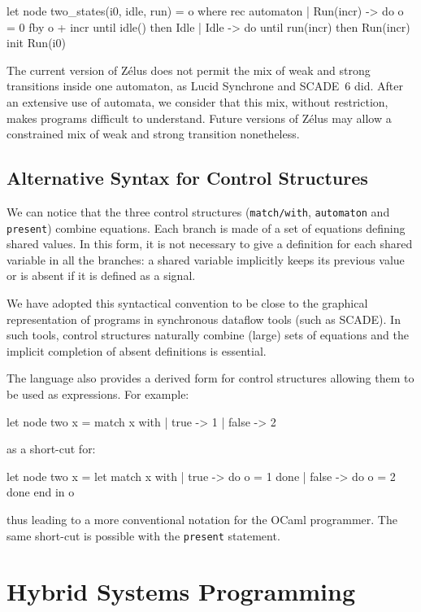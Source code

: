 \documentclass[11pt,titlepage,twoside]{report}
\newcommand{\zelus}{{\sf Z\'elus}}
\newcommand{\lucy}{{\sf Lucid Synchrone}}
\newcommand{\scade}{{\sf SCADE}}
\newcommand{\scadesix}{{\sf SCADE~6}}
\newcommand{\ocaml}{{\sf OCaml}}
\newcommand{\Remark}{\medskip\noindent{\bf Remark: }}
\begin{document}
\begin{runverbatim}[withresult]
let node two_states(i0, idle, run) = o where
  rec automaton
      | Run(incr) -> do o = 0 fby o + incr until idle() then Idle
      | Idle -> do until run(incr) then Run(incr)
      init Run(i0)
\end{runverbatim}

\Remark The current version of \zelus{} does not permit the mix of
weak and strong transitions inside one automaton, as \lucy{} and
\scadesix{} did. After an extensive use of automata, we consider that
this mix, without restriction, makes programs difficult to
understand. Future versions of \zelus{} may allow a constrained mix of
weak and strong transition nonetheless.

\section{Alternative Syntax for Control Structures}
We can notice that the three control structures (\verb+match/with+,
\verb-automaton- and \verb-present-) combine equations. Each branch is
made of a set of equations defining shared values. In this form, it
is not necessary to give a definition for each shared variable in all the
branches: a shared variable implicitly keeps its previous value or
is absent if it is defined as a signal.

We have adopted this syntactical convention to be close to the graphical
representation of programs in synchronous dataflow tools (such as
\scade). In such tools, control structures naturally combine (large) sets of
equations and the implicit completion of absent definitions is
essential.

The language also provides a derived form for control structures
allowing them to be used as expressions. For example:
%
\begin{runverbatim}
let node two x =
  match x with | true -> 1 | false -> 2
\end{runverbatim}
%
as a short-cut for:
\begin{runverbatim}
let node two x =
  let match x with
     |  true -> do o = 1 done
     | false -> do o = 2 done
     end in
  o
\end{runverbatim}
%
thus leading to a more conventional notation for the \ocaml{}
programmer. The same short-cut is possible with the \verb-present- statement.



\chapter{Hybrid Systems Programming}
\label{chapter:ode-programming}
\end{document}
